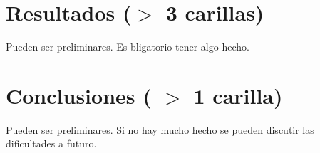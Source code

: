 \documentclass[11pt,a4paper,twoside]{tesis}
\begin{document}
\chapter{Resultados ($>$ 3 carillas)}
Pueden ser preliminares. Es bligatorio tener algo hecho.


\chapter{Conclusiones ( $>$ 1 carilla)} 
Pueden ser preliminares. 
Si no hay mucho hecho se pueden discutir las dificultades a futuro.


\backmatter
%
\end{document}
